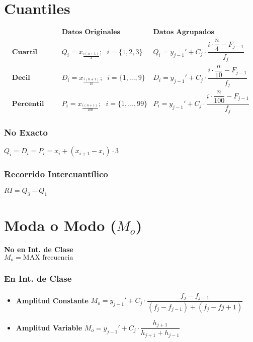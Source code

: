 \documentclass[10pt,letterpaper]{article}
\begin{document}
\section{Cuantiles}

\begin{align*}
\phantom{x} & \textbf{Datos Originales} & \textbf{Datos Agrupados} \\
 \textbf{Cuartil} \phantom{xxx}& Q_i=x_{\frac{i(n+1)}{4}}; \phantom{x} i=\{1,2,3\} &Q_i= y_{j-1}' + C_j \cdot \dfrac{i\cdot\dfrac{n}{4}-F_{j-1} }{f_j}\\
 \textbf{Decil} \phantom{xxx}& D_i=x_{\frac{i(n+1)}{10}}; \phantom{x} i=\{1,\ldots , 9\} & D_i= y_{j-1}' + C_j \cdot \dfrac{i\cdot\dfrac{n}{10}-F_{j-1} }{f_j} \\
 \textbf{Percentil} \phantom{xxx} & P_i=x_{\frac{i(n+1)}{100}}; \phantom{x} i=\{1,\ldots , 99\}  &P_i= y_{j-1}' + C_j \cdot \dfrac{i\cdot\dfrac{n}{100}-F_{j-1} }{f_j} 
\end{align*}
\subsubsection*{No Exacto}
$Q_i=D_i=P_i=x_i+(x_{i+1}-x_i)\cdot 3$
\subsubsection*{Recorrido Intercuantílico}
$RI=Q_3 -Q_1$
\section{Moda o Modo ($M_o$)}


\noindent\textbf{No en Int. de Clase}\\
$M_o=\text{MAX frecuencia}$

\subsubsection*{En Int. de Clase}
\begin{multicols}{2}
\begin{flushleft}
\begin{itemize}
\item \textbf{Amplitud Constante}
$M_o=y_{j-1}' + C_j\cdot \dfrac{f_j - f_{j-1}}{(f_j-f_{j-1})+(f_j-f{j+1})}$
\columnbreak
\item \textbf{Amplitud Variable}
$M_o=y_{j-1}' + C_j\cdot \dfrac{h_{j+1}}{h_{j+1}+h_{j-1}}$
\end{itemize}
\end{flushleft}
\end{multicols}
\end{document}
